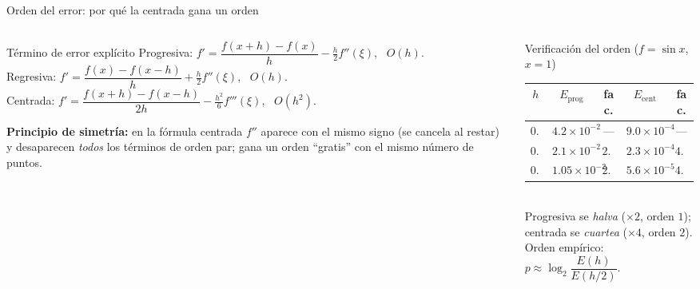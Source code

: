 \documentclass[aspectratio=169,10pt]{beamer}
\begin{document}
\begin{frame}{Orden del error: por qué la centrada gana un orden}
\begin{columns}[T]
\begin{column}{0.50\textwidth}
\begin{cardidea}{Término de error explícito}{\faSuperscript}
{\footnotesize
Progresiva: $f'=\dfrac{f(x{+}h)-f(x)}{h}-\tfrac{h}{2}f''(\xi)$, \ $O(h)$.\\[0.6mm]
Regresiva: $f'=\dfrac{f(x)-f(x{-}h)}{h}+\tfrac{h}{2}f''(\xi)$, \ $O(h)$.\\[0.6mm]
Centrada: $f'=\dfrac{f(x{+}h)-f(x{-}h)}{2h}-\tfrac{h^2}{6}f'''(\xi)$, \ $O(h^2)$.}
\end{cardidea}
\vspace{1mm}
\begin{cardnota}[\faInfoCircle]
{\footnotesize \textbf{Principio de simetría:} en la fórmula centrada $f''$ aparece con el mismo signo (se cancela al restar) y desaparecen \emph{todos} los términos de orden par; gana un orden ``gratis'' con el mismo número de puntos.}
\end{cardnota}
\end{column}
\begin{column}{0.48\textwidth}
\begin{cardgear}{Verificación del orden ($f=\sin x$, $x=1$)}{\faTable}
\centering
{\footnotesize\renewcommand{\arraystretch}{1.3}\setlength{\tabcolsep}{5pt}
\begin{tabular}{c|cc|cc}
$h$ & $E_{\text{prog}}$ & fac. & $E_{\text{cent}}$ & fac.\\\hline
$0.1$ & $4.2{\times}10^{-2}$ & — & $9.0{\times}10^{-4}$ & —\\
$0.05$ & $2.1{\times}10^{-2}$ & $2.0$ & $2.3{\times}10^{-4}$ & $4.0$\\
$0.025$ & $1.05{\times}10^{-2}$ & $2.0$ & $5.6{\times}10^{-5}$ & $4.0$\\
\end{tabular}}\\[1.2mm]
{\footnotesize Progresiva se \emph{halva} ($\times2$, orden $1$); centrada se \emph{cuartea} ($\times4$, orden $2$).\\[0.6mm]
Orden empírico: $p\approx\log_2\!\dfrac{E(h)}{E(h/2)}$.}
\end{cardgear}
\end{column}
\end{columns}
\end{frame}
\end{document}
